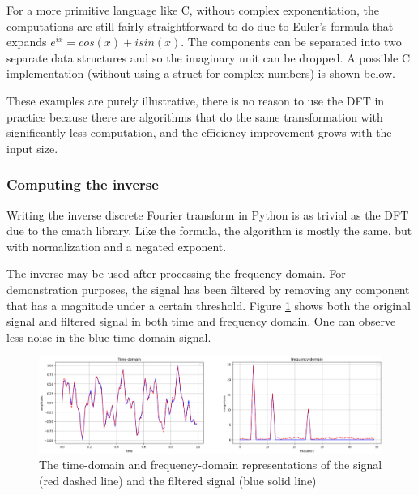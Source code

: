 

For a more primitive language like C, without complex exponentiation, the computations are still fairly straightforward to do due to Euler's formula that expands $e^{ix} = cos(x) + isin(x)$. The components can be separated into two separate data structures and so the imaginary unit can be dropped. A possible C implementation (without using a struct for complex numbers) is shown below. 



These examples are purely illustrative, there is no reason to use the DFT in practice because there are algorithms that do the same transformation with significantly less computation, and the efficiency improvement grows with the input size.

\subsubsection{Computing the inverse}

Writing the inverse discrete Fourier transform in Python is as trivial as the DFT due to the cmath library. Like the formula, the algorithm is mostly the same, but with normalization and a negated exponent.



The inverse may be used after processing the frequency domain. For demonstration purposes, the signal has been filtered by removing any component that has a magnitude under a certain threshold. Figure \ref{fig:DFT-IDFT} shows both the original signal and filtered signal in both time and frequency domain. One can observe less noise in the blue time-domain signal.

\begin{figure}[ht]
    \centering
    \includegraphics[width=\textwidth]{./images/filtered_signal.png}
    \caption{The time-domain and frequency-domain representations of the signal (red dashed line) and the filtered signal (blue solid line)\label{fig:DFT-IDFT}}
\end{figure}

